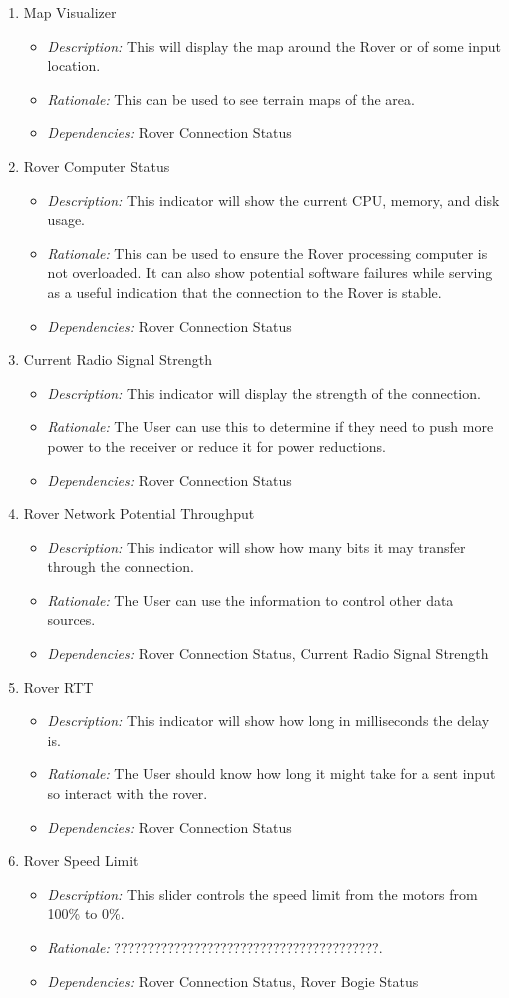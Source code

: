\documentclass[onecolumn, draftclsnofoot, 10pt, compsoc]{IEEEtran}
\newcommand{\functRequ}[4]{
\item #1%
\par
\begin{itemize}
\item \textit{Description:} #2.%
\item \textit{Rationale:} #3.%
\item \textit{Dependencies:} #4%
\end{itemize}
}
\begin{document}
\begin{enumerate}
\functRequ{Map Visualizer}
{This will display the map around the Rover or of some input location}
{This can be used to see terrain maps of the area}
{Rover Connection Status}

\functRequ{Rover Computer Status}
{This indicator will show the current CPU, memory, and disk usage}
{This can be used to ensure the Rover processing computer is not overloaded.
It can also show potential software failures while serving as a useful indication that the connection to the Rover is stable}
{Rover Connection Status}

\functRequ{Current Radio Signal Strength}
{This indicator will display the strength of the connection}
{The User can use this to determine if they need to push more power to the receiver or reduce it for power reductions}
{Rover Connection Status}
  
\functRequ{Rover Network Potential Throughput}
{This indicator will show how many bits it may transfer through the connection}
{The User can use the information to control other data sources}
{Rover Connection Status, Current Radio Signal Strength}

\functRequ{Rover RTT}
{This indicator will show how long in milliseconds the delay is}
{The User should know how long it might take for a sent input so interact with the rover}{Rover Connection Status}

\functRequ{Rover Speed Limit}
{This slider controls the speed limit from the motors from 100\% to 0\%}
{????????????????????????????????????????}
{Rover Connection Status, Rover Bogie Status}
\end{enumerate}
\end{document}
